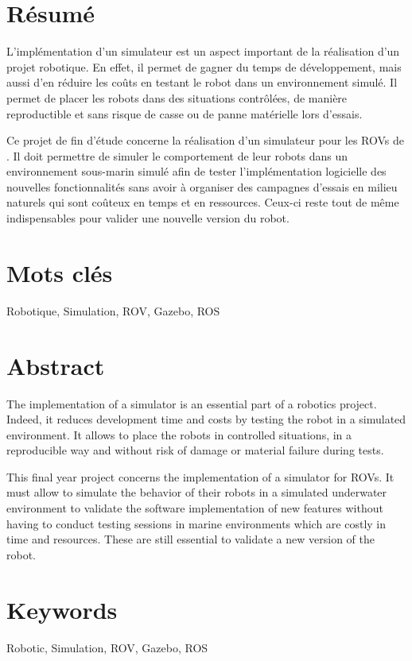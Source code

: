 \section*{Résumé}
	L'implémentation d'un simulateur est un aspect important de la réalisation d'un projet robotique. En effet, il permet de gagner du temps de développement, mais aussi d'en réduire les coûts en testant le robot dans un environnement simulé. Il permet de placer les robots dans des situations contrôlées, de manière reproductible et sans risque de casse ou de panne matérielle lors d'essais.

	Ce projet de fin d'étude concerne la réalisation d'un simulateur pour les \gls{ROV}s de \forssea{}. Il doit permettre de simuler le comportement de leur robots dans un environnement sous-marin simulé afin de tester l'implémentation logicielle des nouvelles fonctionnalités sans avoir à organiser des campagnes d'essais en milieu naturels qui sont coûteux en temps et en ressources. Ceux-ci reste tout de même indispensables pour valider une nouvelle version du robot.

\section*{Mots clés}
Robotique, Simulation, ROV, Gazebo, ROS

\section*{Abstract}

	The implementation of a simulator is an essential part of a robotics project. Indeed, it reduces development time and costs by testing the robot in a simulated environment. It allows to place the robots in controlled situations, in a reproducible way and without risk of damage or material failure during tests.

	This final year project concerns the implementation of a simulator for \forssea{} \gls{ROV}s. It must allow to simulate the behavior of their robots in a simulated underwater environment to validate the software implementation of new features without having to conduct testing sessions in marine environments which are costly in time and resources. These are still essential to validate a new version of the robot.
	
\section*{Keywords}
Robotic, Simulation, ROV, Gazebo, ROS

